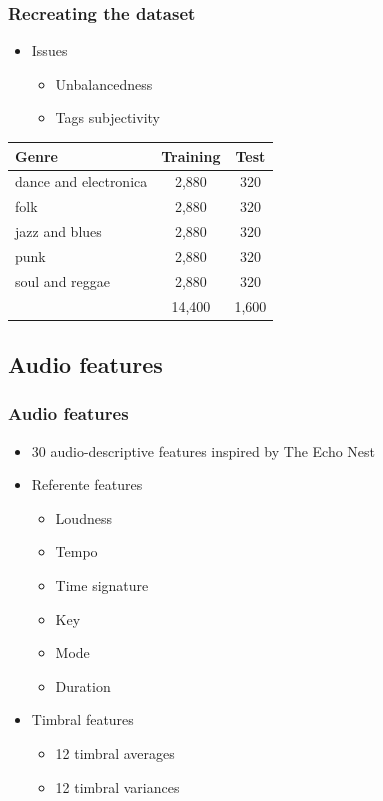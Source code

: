 \documentclass{beamer}
\begin{document}
\begin{frame}
\frametitle{Recreating the dataset}

\begin{itemize}
  \item \alert{Issues}
  \begin{itemize}
    \item Unbalancedness
	\item Tags subjectivity
  \end{itemize}
\end{itemize}

\begin{table}[H]
\begin{center}
\begin{tabular}{l|c|c}
\textbf{Genre}   	  & Training & Test  \\ \hline
dance and electronica & 2,880 	 & 320   \\
folk           		  & 2,880	 & 320	 \\
jazz and blues        & 2,880 	 & 320   \\
punk				  & 2,880    & 320   \\
soul and reggae       & 2,880	 & 320   \\ \hline
					  & 14,400	 & 1,600  \\
\end{tabular}
\end{center}
\end{table}
\end{frame}

\subsection{Audio features}
\frametitle{Audio features}
\begin{frame}
\begin{itemize}
  \item 30 audio-descriptive features inspired by The Echo Nest
  \item \alert{Referente features}
  \begin{itemize}
    \item Loudness
    \item Tempo
    \item Time signature
    \item Key
    \item Mode
    \item Duration
  \end{itemize}
   \item \alert{Timbral features}
  \begin{itemize}
    \item 12 timbral averages
    \item 12 timbral variances
  \end{itemize}
\end{itemize}
\end{frame}
\end{document}

